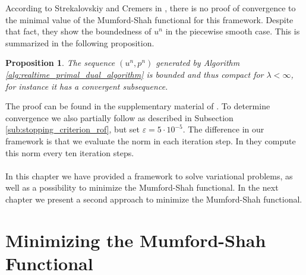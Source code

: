 \documentclass[abstracton]{scrreprt}
\newtheorem{proposition}[theorem]{Proposition}
\begin{document}
            According to Strekalovskiy and Cremers in \cite{Strekalovskiy-Cremers-eccv14}, there is no proof of convergence to the minimal value of the Mumford-Shah functional for this framework. Despite that fact, they show the boundedness of $u^{n}$ in the piecewise smooth case. This is summarized in the following proposition.
            \begin{proposition}
                The sequence $(u^{n}, p^{n})$ generated by Algorithm \ref{alg:realtime_primal_dual_algorithm} is bounded and thus compact for $\lambda < \infty$, for instance it has a convergent subsequence.
            \end{proposition}
            The proof can be found in the supplementary material of \cite{Strekalovskiy-Cremers-eccv14}. To determine convergence we also partially follow \cite{Strekalovskiy-Cremers-eccv14} as described in Subsection \ref{sub:stopping_criterion_rof}, but set $\varepsilon = 5 \cdot 10^{-5}$. The difference in our framework is that we evaluate the norm in each iteration step. In \cite{Strekalovskiy-Cremers-eccv14} they compute this norm every ten iteration steps. \\\\
    In this chapter we have provided a framework to solve variational problems, as well as a possibility to minimize the Mumford-Shah functional. In the next chapter we present a second approach to minimize the Mumford-Shah functional.


\chapter{Minimizing the Mumford-Shah Functional} %
\label{cha:minimizing_the_mumford_shah_functional}
\end{document}
